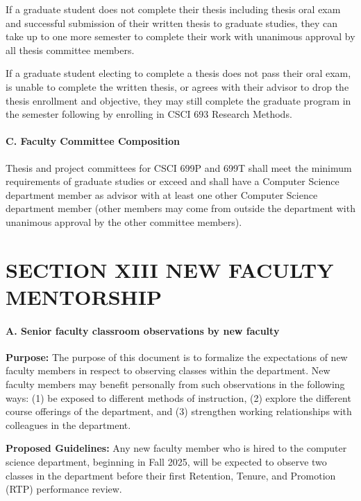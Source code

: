 \documentclass{scrartcl}
\begin{document}
If a graduate student does not complete their thesis including thesis oral exam and successful submission of their written thesis to graduate studies, they can take up to one more semester to complete their work with unanimous approval by all thesis committee members.

If a graduate student electing to complete a thesis does not pass their oral exam, is unable to complete the written thesis, or agrees with their advisor to drop the thesis enrollment and objective, they may still complete the graduate program in the semester following by enrolling in CSCI 693 Research Methods.

\paragraph{C. Faculty Committee Composition}


Thesis and project committees for CSCI 699P and 699T shall meet the minimum requirements of graduate studies or exceed and shall have a Computer Science department member as advisor with at least one other Computer Science department member (other members may come from outside the department with unanimous approval by the other committee members).

\section*{SECTION XIII NEW FACULTY MENTORSHIP}
{}


\paragraph{A. Senior faculty classroom observations by new faculty}

\textbf{Purpose:} The purpose of this document is to formalize the expectations of new faculty members in respect to observing classes within the department. New faculty members may benefit personally from such observations in the following ways: (1) be exposed to different methods of instruction, (2) explore the different course offerings of the department, and (3) strengthen working relationships with colleagues in the department.

\textbf{Proposed Guidelines:} Any new faculty member who is hired to the computer science department, beginning in Fall 2025, will be expected to observe two classes in the department before their first Retention, Tenure, and Promotion (RTP) performance review.
\end{document}

